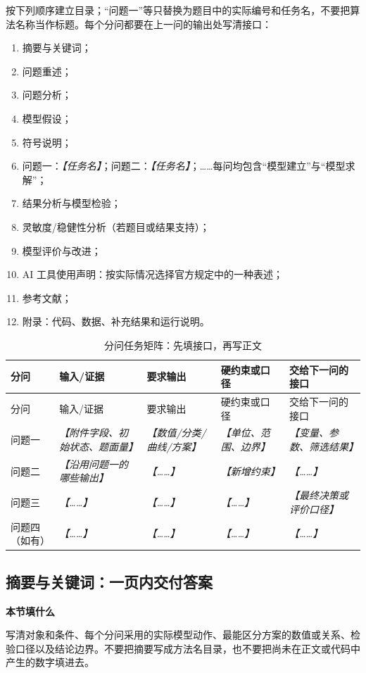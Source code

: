 \documentclass[UTF8,zihao=-4]{ctexart}
\newcommand{\slot}[1]{\textcolor{inkblue}{\textit{【#1】}}}
\newcommand{\guidehead}[1]{\par\medskip\noindent\textbf{\color{inkblue}#1}\par}
\begin{document}
按下列顺序建立目录；“问题一”等只替换为题目中的实际编号和任务名，不要把算法名称当作标题。每个分问都要在上一问的输出处写清接口：

\begin{enumerate}
  \item 摘要与关键词；
  \item 问题重述；
  \item 问题分析；
  \item 模型假设；
  \item 符号说明；
  \item 问题一：\slot{任务名}；问题二：\slot{任务名}；……每问均包含“模型建立”与“模型求解”；
  \item 结果分析与模型检验；
  \item 灵敏度/稳健性分析（若题目或结果支持）；
  \item 模型评价与改进；
  \item AI 工具使用声明：按实际情况选择官方规定中的一种表述；
  \item 参考文献；
  \item 附录：代码、数据、补充结果和运行说明。
\end{enumerate}

\begin{longtable}{p{1.2cm}p{3.0cm}p{3.0cm}p{3.0cm}p{4.2cm}}
\caption{分问任务矩阵：先填接口，再写正文}\label{tab:template-task-matrix}\\
\toprule
分问 & 输入/证据 & 要求输出 & 硬约束或口径 & 交给下一问的接口\\
\midrule
\endfirsthead
\toprule
分问 & 输入/证据 & 要求输出 & 硬约束或口径 & 交给下一问的接口\\
\midrule
\endhead
问题一 & \slot{附件字段、初始状态、题面量} & \slot{数值/分类/曲线/方案} & \slot{单位、范围、边界} & \slot{变量、参数、筛选结果}\\
问题二 & \slot{沿用问题一的哪些输出} & \slot{……} & \slot{新增约束} & \slot{……}\\
问题三 & \slot{……} & \slot{……} & \slot{……} & \slot{最终决策或评价口径}\\
问题四（如有） & \slot{……} & \slot{……} & \slot{……} & \slot{……}\\
\bottomrule
\end{longtable}

\subsection{摘要与关键词：一页内交付答案}

\guidehead{本节填什么}写清对象和条件、每个分问采用的实际模型动作、最能区分方案的数值或关系、检验口径以及结论边界。不要把摘要写成方法名目录，也不要把尚未在正文或代码中产生的数字填进去。
\end{document}
